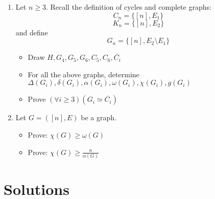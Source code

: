 \documentclass[11pt,paper=b5,footinclude,headinclude]{scrbook} %
\theoremstyle{remark}
\theoremstyle{definition} %
\theoremstyle{theorem} %
\begin{document}
\begin{enumerate}
\item Let $n\ge 3$. Recall the definition of cycles and complete graphs:
\[C_{n}=\{[n], E_{1}\}\]
\[K_{n}=\{[n], E_{2}\}\]
and define
\[G_{n}=\{[n], E_{2} \setminus E_{1}\}\]
\begin{itemize}
    \item Draw \(H, G_{4}, G_{5}, G_{6}, C_{5}, C_{6}, \overline{C_{i}}\)
    \item For all the above graphs, determine \(\Delta(G_{i}), \delta(G_{i}), \alpha(G_{i}), \omega(G_{i}), \chi(G_{i}), g(G_{i})\)
    \item Prove \((\forall i \geq 3) (G_{i} \simeq \overline{C_{i}})\)
\end{itemize}

\item Let \(G = ([n], E)\) be a graph.
\begin{itemize}
\item Prove: \(\chi (G) \geq \omega (G)\)
\item Prove: \(\chi (G) \geq \frac{n}{\alpha(G)}\)
\end{itemize}

\end{enumerate}


\chapter{Solutions} 
\end{document}
